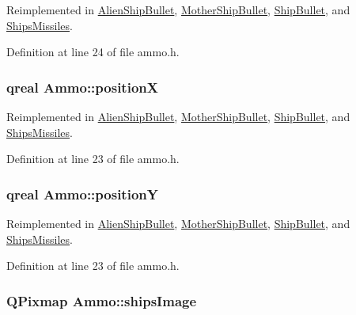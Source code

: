 Reimplemented in \hyperlink{class_alien_ship_bullet_a6323f9356a3f49ec9d3838203f806702}{AlienShipBullet}, \hyperlink{class_mother_ship_bullet_a76e8ce486a76094373b5afacfc754b8a}{MotherShipBullet}, \hyperlink{class_ship_bullet_a481df890ebe98e14a9fed36020a5e265}{ShipBullet}, and \hyperlink{class_ships_missiles_a1a31e013e3e81f518aa8f99bbb684357}{ShipsMissiles}.

Definition at line 24 of file ammo.h.\hypertarget{class_ammo_a7df8c23c0a3023e013c25e2b3fff5385}{
\subsubsection[{positionX}]{\setlength{\rightskip}{0pt plus 5cm}qreal {\bf Ammo::positionX}}}
\label{class_ammo_a7df8c23c0a3023e013c25e2b3fff5385}


Reimplemented in \hyperlink{class_alien_ship_bullet_a961d9fe7f586e37bb06f0a1d5f6c5923}{AlienShipBullet}, \hyperlink{class_mother_ship_bullet_a5a9173af31257e18fa08bcb1b30afe11}{MotherShipBullet}, \hyperlink{class_ship_bullet_a24067ecee3430c3094aeee3a5de4740b}{ShipBullet}, and \hyperlink{class_ships_missiles_ad7c34c9db83c3ed6ecca7ec25c119123}{ShipsMissiles}.

Definition at line 23 of file ammo.h.\hypertarget{class_ammo_a71fc5db64ac2f32ca10e22f7a7ff0c88}{
\subsubsection[{positionY}]{\setlength{\rightskip}{0pt plus 5cm}qreal {\bf Ammo::positionY}}}
\label{class_ammo_a71fc5db64ac2f32ca10e22f7a7ff0c88}


Reimplemented in \hyperlink{class_alien_ship_bullet_a1315cc85ceb3c3573305d78e651b1330}{AlienShipBullet}, \hyperlink{class_mother_ship_bullet_ac20e2e77d3cbac30f2189495fbdce88d}{MotherShipBullet}, \hyperlink{class_ship_bullet_a65c6f482103ca4c3e90648829e8cac5d}{ShipBullet}, and \hyperlink{class_ships_missiles_ace3adf616edc81579fcfd0b2dc76496f}{ShipsMissiles}.

Definition at line 23 of file ammo.h.\hypertarget{class_ammo_a605ab79d9b1c76edb5f2d889cbc014f3}{
\subsubsection[{shipsImage}]{\setlength{\rightskip}{0pt plus 5cm}QPixmap {\bf Ammo::shipsImage}}}
\label{class_ammo_a605ab79d9b1c76edb5f2d889cbc014f3}


